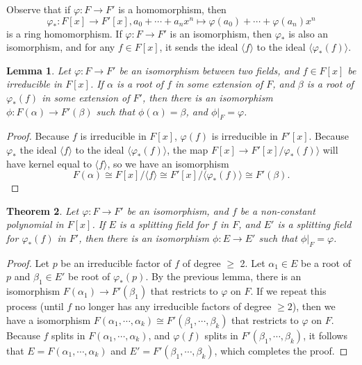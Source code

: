 \documentclass[12pt]{report}
\newtheorem{thm}{Theorem}[section]
\newtheorem{lemma}[thm]{Lemma}
\theoremstyle{definition}
\def\aa{\alpha}
\def\bb{\beta}
\begin{document}
Observe that if $\varphi : F \to F'$ is a homomorphism, then
$$\varphi_*:F[x]\to F'[x], a_0+\cdots+a_nx^n\mapsto \varphi(a_0)+\cdots+\varphi(a_n)x^n $$  
is a ring homomorphism. If $\varphi : F \to F'$ is an isomorphism, then $\varphi_*$ is also an isomorphism, and for any $f \in F[x]$, it sends the ideal $\langle f\rangle$ to the ideal $\langle \varphi_*(f)\rangle$.

\begin{lemma}\label{splitlemma1}
    Let $\varphi : F \to F'$ be an isomorphism between two fields, and $f \in F[x]$ be irreducible in $F[x]$. If $\aa$ is a root of $f$ in some extension of $F$, and $\bb$ is a root of $\varphi_*(f)$ in some extension of $F'$, then there is an isomorphism $\phi : F(\aa) \to F'(\bb)$ such that $\phi(\aa) = \bb$, and $\phi|_F= \varphi$.
\end{lemma}

\begin{proof}
    Because $f$ is irreducible in $F[x]$, $\varphi(f)$ is irreducible in $F'[x]$. Because $\varphi_*$ the ideal $\langle f\rangle$ to the ideal $\langle \varphi_*(f)\rangle$, the map $F[x] \to F'[x]/\varphi_*(f)\rangle$ will have kernel equal to $\langle f\rangle$, so we have an isomorphism $$F(\aa)\cong F[x]/\langle f\rangle \cong F'[x]/\langle \varphi_*(f)\rangle \cong F'(\bb).$$
\end{proof}

\begin{thm}
    Let $\varphi: F \to F'$ be an isomorphism, and $f$ be a non-constant polynomial in $F[x]$. If $E$ is a splitting field for $f$ in $F$, and $E'$ is a splitting field for $\varphi_*(f)$ in $F'$, then there is an isomorphism $\phi : E \to E'$ such that $\phi|_F= \varphi$.
\end{thm}

\begin{proof}
    Let $p$ be an irreducible factor of $f$ of degree $\geq$ 2. Let $\aa_1 \in E$ be a root of $p$ and $\bb_1 \in E'$ be root of $\varphi_*(p)$. By the previous lemma, there is an isomorphism $F(\aa_1) \to F'(\bb_1)$ that restricts to $\varphi$ on $F$. If we repeat this process (until $f$ no longer has any irreducible factors of degree $\geq 2$), then we have a isomorphism $F(\aa_1,\cdots, \aa_k) \cong F'(\bb_1,\cdots, \bb_k)$ that restricts to $\varphi$ on $F$. Because $f$ splits in $F(\aa_1,\cdots, \aa_k)$, and $\varphi(f)$ splits in $F'(\bb_1,\cdots, \bb_k)$, it follows that $E = F(\aa_1,\cdots, \aa_k)$ and $E' = F'(\bb_1,\cdots, \bb_k)$, which completes the proof.
\end{proof}
\end{document}

